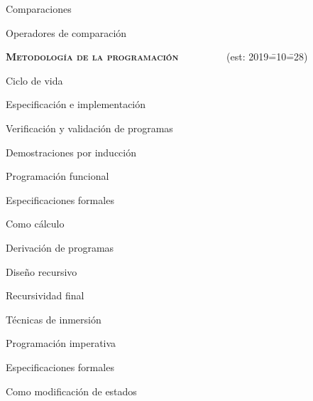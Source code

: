 \begin{longenum}
\begin{longenum}
\begin{longenum}
            \item Comparaciones
            \begin{longenum}
                \item Operadores de comparación
            \end{longenum}
        \end{longenum}
    \end{longenum}
    \item \textbf{\textsc{Metodología de la programación}} \ \ \ \ \ \ \ \ \ (est: 2019\==10\==28)
    \begin{longenum}
        \item Ciclo de vida
        \item Especificación e implementación
        \item Verificación y validación de programas
        \begin{longenum}
            \item Demostraciones por inducción
        \end{longenum}
        \item Programación funcional
        \begin{longenum}
            \item Especificaciones formales
            \begin{longenum}
                \item Como cálculo
            \end{longenum}
            \item Derivación de programas
            \begin{longenum}
                \item Diseño recursivo
                \begin{longenum}
                    \item Recursividad final
                    \item Técnicas de inmersión \opcional\
                \end{longenum}
            \end{longenum}
        \end{longenum}
        \item Programación imperativa
        \begin{longenum}
            \item Especificaciones formales
            \begin{longenum}
                \item Como modificación de estados

\end{longenum}
\end{longenum}
\end{longenum}
\end{longenum}
